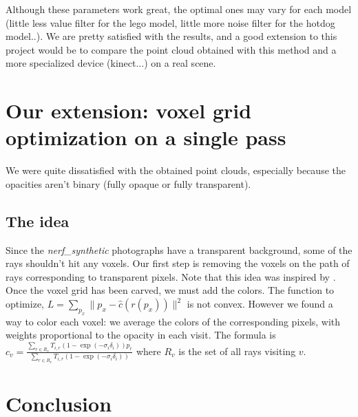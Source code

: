 \documentclass{article}
\begin{document}
Although these parameters work great, the optimal ones may vary for each model (little less value filter for the lego model, little more noise filter for the hotdog model..). We are pretty satisfied with the results, and a good extension to this project would be to compare the point cloud obtained with this method and a more specialized device (kinect...) on a real scene.

\section{Our extension: voxel grid optimization on a single pass}
We were quite dissatisfied with the obtained point clouds, especially because the opacities aren't binary (fully opaque or fully transparent). 

\subsection{The idea}
Since the \textit{nerf\_synthetic} photographs have a transparent background, some of the rays shouldn't hit any voxels. Our first step is removing the voxels on the path of rays corresponding to transparent pixels. Note that this idea was inspired by \cite{spacecarving}. Once the voxel grid has been carved, we must add the colors. The function to optimize, $L = \sum_{p_x} \|p_x -\hat{c}(r(p_x)) \|^2$ is not convex. However we found a way to color each voxel: we average the colors of the corresponding pixels, with weights proportional to the opacity in each visit. The formula is $c_v = \frac{ \sum_{r \in R_v} T_{i,r}  (1 - \exp(-\sigma_i \delta_i)) p_r }{ \sum_{r \in R_v} T_{i,r}  (1 - \exp(-\sigma_i \delta_i))  }$ where $R_v$ is the set of all rays visiting $v$.



\section{Conclusion}
\newpage


\end{document}
